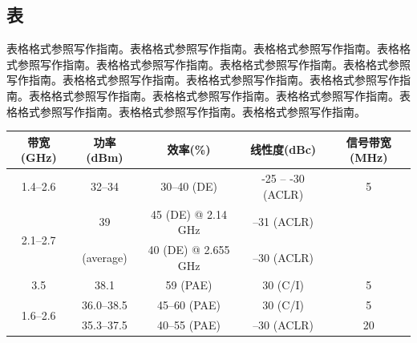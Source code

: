 \subsection{表}
% 
%
表格格式参照写作指南。表格格式参照写作指南。表格格式参照写作指南。表格格式参照写作指南。表格格式参照写作指南。表格格式参照写作指南。表格格式参照写作指南。表格格式参照写作指南。表格格式参照写作指南。表格格式参照写作指南。表格格式参照写作指南。表格格式参照写作指南。表格格式参照写作指南。表格格式参照写作指南。表格格式参照写作指南。表格格式参照写作指南。

\vspace{-0.1cm}

\begin{table}[h]
	\renewcommand{\arraystretch}{1.5}
	\label{tab_1}
	\centering
	\wuhao
	\begin{tabular}{c c c c c }
		\hline
		{\textbf{带宽}(GHz)}&{\textbf{功率}(dBm)}&{\textbf{效率}(\%)}&{\textbf{线性度}(dBc)}&{\textbf{信号带宽}(MHz)}\\
		\hline
		1.4--2.6&32--34&30--40 (DE)&-25 -- -30 (ACLR)&5\\
		\hline
		\multirow{2}{*}{2.1--2.7}&39&45 (DE) @ 2.14 GHz&--31 (ACLR)&\multirow{2}{*}{\diagbox{\qquad}{\qquad}}\\\cline{3-4}
		&(average)&40 (DE) @ 2.655 GHz&--30 (ACLR)& \\
		\hline
		3.5&38.1&59 (PAE)&30 (C/I)&5\\
		\hline
		\multirow{2}{*}{1.6--2.6}&36.0--38.5&45--60 (PAE)&30 (C/I)&5\\\cline{2-5}
		&35.3--37.5&40--55 (PAE)&--30 (ACLR)&20\\
		\hline
	\end{tabular}
\end{table}

